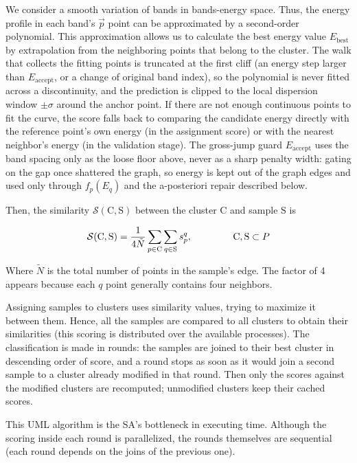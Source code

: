 \documentclass[a4paper,12pt]{report}
\begin{document}
\begin{appendices}
We consider a smooth variation of bands in bands-energy space. Thus, the energy profile in each band's $\vec{p}$ point can be approximated by a second-order polynomial. This approximation allows us to calculate the best energy value $E_\text{best}$ by extrapolation from the neighboring points that belong to the cluster.
The walk that collects the fitting points is truncated at the first cliff (an energy step larger than $E_\text{accept}$, or a change of original band index), so the polynomial is never fitted across a discontinuity, and the prediction is clipped to the local dispersion window $\pm\sigma$ around the anchor point.
If there are not enough continuous points to fit the curve, the score falls back to comparing the candidate energy directly with the reference point's own energy (in the assignment score) or with the nearest neighbor's energy (in the validation stage).
The gross-jump guard $E_\text{accept}$ uses the band spacing only as the loose floor above, never as a sharp penalty width: gating on the gap once shattered the graph, so energy is kept out of the graph edges and used only through $f_p(E_q)$ and the a-posteriori repair described below.




Then, the similarity $\mathcal{S}(\mathrm{C},\mathrm{S})$ between the cluster $\mathrm{C}$ and sample $\mathrm{S}$  is

\begin{equation}
    \mathcal{S}(\mathrm{C},\mathrm{S}) = \frac{1}{4\tilde{N}}\sum_{p\in \mathrm{C}}\sum_{q\in\mathrm{S}} s_p^q,\hspace{1.5cm}\mathrm{C},\mathrm{S}\subset P
\end{equation}

Where $\tilde{N}$ is the total number of points in the sample's edge. The factor of 4 appears because each $q$ point generally contains four neighbors.

Assigning samples to clusters uses similarity values, trying to maximize it between them.
Hence, all the samples are compared to all clusters to obtain their similarities (this scoring is distributed over the available processes). The classification is made in rounds: the samples are joined to their best cluster in descending order of score, and a round stops as soon as it would join a second sample to a cluster already modified in that round. Then only the scores against the modified clusters are recomputed; unmodified clusters keep their cached scores.

This UML algorithm is the SA's bottleneck in executing time. Although the scoring inside each round is parallelized, the rounds themselves are sequential (each round depends on the joins of the previous one).


\end{appendices}
\end{document}
